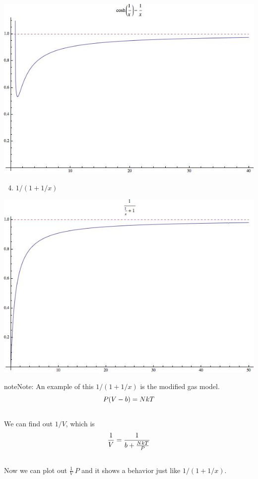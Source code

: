 \documentclass[letterpaper,10pt,english]{sphinxmanual}
\begin{document}
{\hfill\includegraphics{cosh1.jpg}\hfill}
\begin{enumerate}
\setcounter{enumi}{3}
\item {} 
$1/(1+1/x)$

\end{enumerate}

{\hfill\includegraphics{fraction1.jpg}\hfill}

\begin{notice}{note}{Note:}
An example of this $1/(1+1/x)$ is the modified gas model.
\begin{gather}
\begin{split}P (V - b) = N k T\end{split}\notag\\\begin{split}\end{split}\notag
\end{gather}
We can find out $1/V$, which is
\begin{gather}
\begin{split}\frac{1}{V} = \frac{1}{b+\frac{N k T}{P}}\end{split}\notag\\\begin{split}\end{split}\notag
\end{gather}
Now we can plot out $\frac{1}{V} ~ P$ and it shows a behavior just like $1/(1+1/x)$.
\end{notice}
\end{document}
